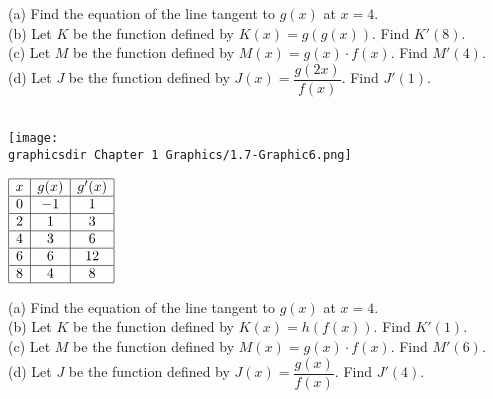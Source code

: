 (a) Find the equation of the line tangent to $g(x)$ at $x = 4$. \\[11pt]
(b) Let $K$ be the function defined by $K(x) = g(g(x))$. Find $K'(8)$. \\[11pt]
(c) Let $M$ be the function defined by $M(x) = g(x) \cdot f(x)$. Find $M'(4)$. \\[11pt]
(d) Let $J$ be the function defined by $J(x) = \dfrac{g(2x)}{f(x)}$. Find $J'(1)$. \\[11pt]

 \\
\begin{minipage}[t]{0.75\textwidth} \vspace{0pt}%
    \texttt{[image: \\graphicsdir Chapter 1 Graphics/1.7-Graphic6.png]}
\end{minipage} \hfill \begin{minipage}[t]{0.2\textwidth} \vspace{11pt}%
    \def\arraystretch{1.4}
    $\begin{array}{|c|c|c|}
        \hline
        x & g(x) & g'(x) \\ \hline
        0 & -1 & 1 \\ \hline
        2 & 1 & 3 \\ \hline
        4 & 3 & 6 \\ \hline
        6 & 6 & 12 \\ \hline
        8 & 4 & 8 \\
        \hline
    \end{array}$
\end{minipage} 

(a) Find the equation of the line tangent to $g(x)$ at $x = 4$. \\[11pt]
(b) Let $K$ be the function defined by $K(x) = h(f(x))$. Find $K'(1)$. \\[11pt]
(c) Let $M$ be the function defined by $M(x) = g(x) \cdot f(x)$. Find $M'(6)$. \\[11pt]
(d) Let $J$ be the function defined by $J(x) = \dfrac{g(x)}{f(x)}$. Find $J'(4)$. \\[11pt]

